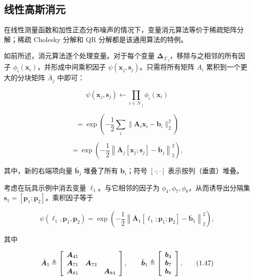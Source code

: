 \subsection{线性高斯消元}

在线性测量函数和加性正态分布噪声的情况下，变量消元算法等价于稀疏矩阵分解；稀疏 Cholesky 分解和 QR 分解都是该通用算法的特例。

如前所述，消元算法逐个处理变量。对于每个变量 $\boldsymbol\Delta_{\boldsymbol{\mathcal{X}}_j}$，移除与之相邻的所有因子 $\phi_i(\pmb x_i)$，并形成中间乘积因子 $\psi(\pmb x_j,\pmb s_j)$。只需将所有矩阵 $A_i$ 累积到一个更大的分块矩阵 $\bar A_j$ 中即可：

\begin{equation}
\psi(\boldsymbol {x} _ {j}, \boldsymbol {s} _ {j}) \leftarrow \prod_ {i \in \mathcal {N} _ {j}} \phi_ {i} (\boldsymbol {x} _ {i})\tag{1.45a}
\end{equation}

\begin{equation}
= \exp \left(- \frac {1}{2} \sum_ {i} \| \boldsymbol {A} _ {i} \boldsymbol {x} _ {i} - \boldsymbol {b} _ {i} \| _ {2} ^ {2}\right)\tag{1.45b}
\end{equation}

\begin{equation}
= \exp \left(- \frac {1}{2} \left\| \bar {\boldsymbol {A}} _ {j} [ \boldsymbol {x} _ {j}; \boldsymbol {s} _ {j} ] - \bar {\boldsymbol {b}} _ {j} \right\| _ {2} ^ {2}\right),\tag{1.45c}
\end{equation}

其中，新的右端项向量 $\bar{\boldsymbol b}_j$ 堆叠了所有 $\boldsymbol b_i$；符号 $[\cdot;\cdot]$ 表示按列（垂直）堆叠。

考虑在玩具示例中消去变量 $\ell_1$。与它相邻的因子为 $\phi_4,\phi_7,\phi_8$，从而诱导出分隔集 $\pmb s_1=[\pmb p_1;\pmb p_2]$。乘积因子等于

\begin{equation}
\psi \left(\boldsymbol {\ell} _ {1}, \boldsymbol {p} _ {1}, \boldsymbol {p} _ {2}\right) = \exp \left(- \frac {1}{2} \left\| \bar {\boldsymbol {A}} _ {1} [ \boldsymbol {\ell} _ {1}; \boldsymbol {p} _ {1}; \boldsymbol {p} _ {2} ] - \bar {\boldsymbol {b}} _ {1} \right\| _ {2} ^ {2}\right),\tag{1.46}
\end{equation}

其中

\begin{equation}
\bar {\boldsymbol {A}} _ {1} \triangleq \left[ \begin{array}{c c c} \boldsymbol {A} _ {4 1} & & \\ \boldsymbol {A} _ {7 1} & \boldsymbol {A} _ {7 3} & \\ \boldsymbol {A} _ {8 1} & & \boldsymbol {A} _ {8 4} \end{array} \right], \qquad \bar {\boldsymbol {b}} _ {1} \triangleq \left[ \begin{array}{c} \boldsymbol {b} _ {4} \\ \boldsymbol {b} _ {7} \\ \boldsymbol {b} _ {8} \end{array} \right].\tag{1.47}
\end{equation}

